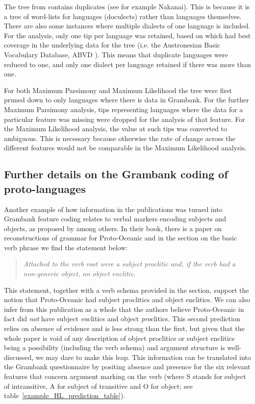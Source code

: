 \documentclass[a4paper,10pt]{article} %
\begin{document}
The tree from \citet{grayetal_2009} contains duplicates (see for example Nakanai). This is because it is a tree of word-lists for languages (doculects) rather than languages themselves. There are also some instances where multiple dialects of one language is included. For the analysis, only one tip per language was retained, based on which had best coverage in the underlying data for the tree (i.e. the Austronesian Basic Vocabulary Database, ABVD \citep{ABVD}). This means that duplicate languages were reduced to one, and only one dialect per language retained if there was more than one. 


For both Maximum Parsimony and Maximum Likelihood the tree were first pruned down to only languages where there is data in Grambank. For the further Maximum Parsimony analysis, tips representing languages where the data for a particular feature was missing were dropped for the analysis of that feature. For the Maximum Likelihood analysis, the value at such tips was converted to ambiguous. This is necessary because otherwise the rate of change across the different features would not be comparable in the Maximum Likelihood analysis.


\subsection{Further details on the Grambank coding of proto-languages }
\label{supp:proto_lg_coding}
Another example of how information in the publications was turned into Grambank feature coding relates to verbal markers encoding subjects and objects, as proposed by \citet{lynchrosscrowley_proto_grammar_oceanic} among others. In their book, there is a paper on reconstructions of grammar for Proto-Oceanic and in the section on the basic verb phrase we find the statement below:

\begin{quotation}
\noindent\emph{Attached to the verb root were a subject proclitic and, if the verb had a non-generic object, an object enclitic.} \end{quotation} \begin{flushright} \citet[83]{lynchrosscrowley_proto_grammar_oceanic} \end{flushright}

This statement, together with a verb schema provided in the section, support the notion that Proto-Oceanic had subject proclitics and object enclitics. We can also infer from this publication as a whole that the authors believe Proto-Oceanic in fact did \emph{not} have subject \emph{en}clitics and object \emph{pro}clitics. This second prediction relies on absence of evidence and is less strong than the first, but given that the whole paper is void of any description of object proclitics or subject enclitics being a possibility (including the verb schema) and argument structure is well-discussed, we may dare to make this leap. This information can be translated into the Grambank questionnaire by positing absence and presence for the six relevant features that concern argument marking on the verb (where S stands for subject of intransitive, A for subject of transitive and O for object; see table~\ref{example_HL_prediction_table}).
\end{document}

